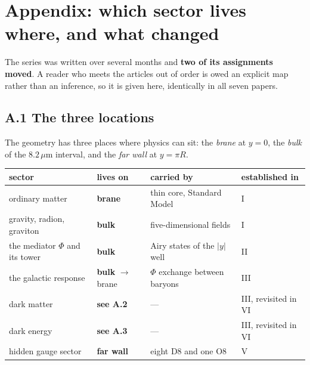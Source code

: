 \section*{Appendix: which sector lives where, and what changed}

The series was written over several months and \textbf{two of its assignments moved}.
A reader who meets the articles out of order is owed an explicit map rather than an
inference, so it is given here, identically in all seven papers.

\subsection*{A.1 The three locations}
The geometry has three places where physics can sit: the \emph{brane} at $y=0$,
the \emph{bulk} of the $8.2\,\mu$m interval, and the \emph{far wall} at $y=\pi R$.
\begin{center}\small
\begin{tabular}{llll}\toprule
sector & lives on & carried by & established in\\\midrule
ordinary matter & \textbf{brane} & thin core, Standard Model & I\\
gravity, radion, graviton & \textbf{bulk} & five-dimensional fields & I\\
the mediator $\Phi$ and its tower & \textbf{bulk} & Airy states of the $|y|$ well & II\\
the galactic response & \textbf{bulk} $\to$ brane & $\Phi$ exchange between baryons & III\\
dark matter & \textbf{see A.2} & --- & III, revisited in VI\\
dark energy & \textbf{see A.3} & --- & III, revisited in VI\\
hidden gauge sector & \textbf{far wall} & eight D8 and one O8 & V\\\bottomrule
\end{tabular}
\end{center}

